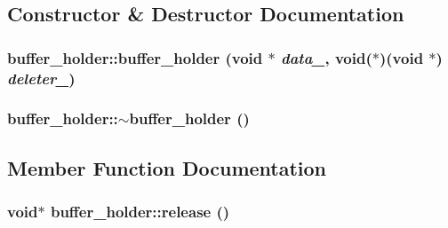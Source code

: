 \subsection{Constructor \& Destructor Documentation}
\hypertarget{structbuffer__holder_aec91ad4dabc8db2a6cacac601b317857}{
\subsubsection[{buffer\_\-holder}]{\setlength{\rightskip}{0pt plus 5cm}buffer\_\-holder::buffer\_\-holder (void $\ast$ {\em data\_\-}, \/  void($\ast$)(void $\ast$) {\em deleter\_\-})}}
\label{structbuffer__holder_aec91ad4dabc8db2a6cacac601b317857}
\hypertarget{structbuffer__holder_a43e10af0ca501bfa9bd1c2a012937876}{
\subsubsection[{$\sim$buffer\_\-holder}]{\setlength{\rightskip}{0pt plus 5cm}buffer\_\-holder::$\sim$buffer\_\-holder ()}}
\label{structbuffer__holder_a43e10af0ca501bfa9bd1c2a012937876}


\subsection{Member Function Documentation}
\hypertarget{structbuffer__holder_add9b75027bdf15dee0e2dc88225d5b10}{
\subsubsection[{release}]{\setlength{\rightskip}{0pt plus 5cm}void$\ast$ buffer\_\-holder::release ()}}
\label{structbuffer__holder_add9b75027bdf15dee0e2dc88225d5b10}


